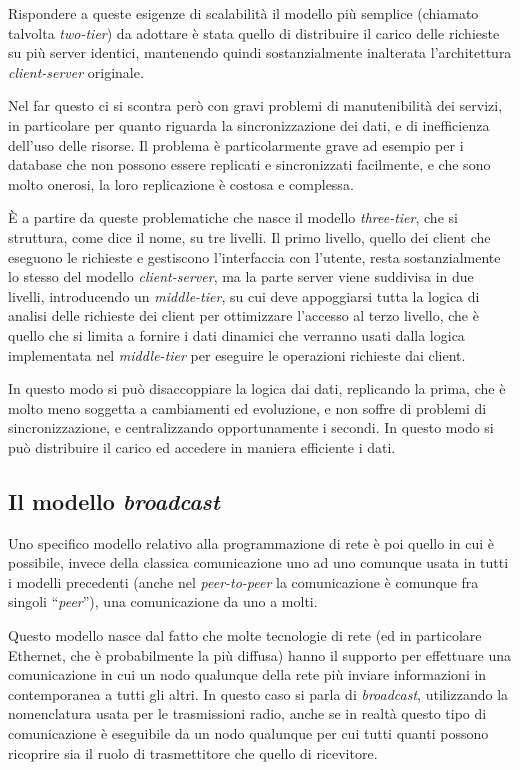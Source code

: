 Rispondere a queste esigenze di scalabilità il modello più semplice (chiamato
talvolta \textit{two-tier}) da adottare è stata quello di distribuire il
carico delle richieste su più server identici, mantenendo quindi
sostanzialmente inalterata l'architettura \textit{client-server} originale.

Nel far questo ci si scontra però con gravi problemi di manutenibilità dei
servizi, in particolare per quanto riguarda la sincronizzazione dei dati, e di
inefficienza dell'uso delle risorse. Il problema è particolarmente grave ad
esempio per i database che non possono essere replicati e sincronizzati
facilmente, e che sono molto onerosi, la loro replicazione è costosa e
complessa.

È a partire da queste problematiche che nasce il modello \textit{three-tier},
che si struttura, come dice il nome, su tre livelli. Il primo livello, quello
dei client che eseguono le richieste e gestiscono l'interfaccia con l'utente,
resta sostanzialmente lo stesso del modello \textit{client-server}, ma la
parte server viene suddivisa in due livelli, introducendo un
\textit{middle-tier}, su cui deve appoggiarsi tutta la logica di analisi delle
richieste dei client per ottimizzare l'accesso al terzo livello, che è quello
che si limita a fornire i dati dinamici che verranno usati dalla logica
implementata nel \textit{middle-tier} per eseguire le operazioni richieste dai
client.

In questo modo si può disaccoppiare la logica dai dati, replicando la prima,
che è molto meno soggetta a cambiamenti ed evoluzione, e non soffre di
problemi di sincronizzazione, e centralizzando opportunamente i secondi. In
questo modo si può distribuire il carico ed accedere in maniera efficiente i
dati.


\subsection{Il modello \textit{broadcast}}
\label{sec:net_broadcast}

Uno specifico modello relativo alla programmazione di rete è poi quello in cui
è possibile, invece della classica comunicazione uno ad uno comunque usata in
tutti i modelli precedenti (anche nel \textit{peer-to-peer} la comunicazione è
comunque fra singoli ``\textit{peer}''), una comunicazione da uno a molti.


Questo modello nasce dal fatto che molte tecnologie di rete (ed in particolare
Ethernet, che è probabilmente la più diffusa) hanno il supporto per effettuare
una comunicazione in cui un nodo qualunque della rete più inviare informazioni
in contemporanea a tutti gli altri. In questo caso si parla di
\textit{broadcast}, utilizzando la nomenclatura usata per le trasmissioni
radio, anche se in realtà questo tipo di comunicazione è eseguibile da un nodo
qualunque per cui tutti quanti possono ricoprire sia il ruolo di trasmettitore
che quello di ricevitore.

